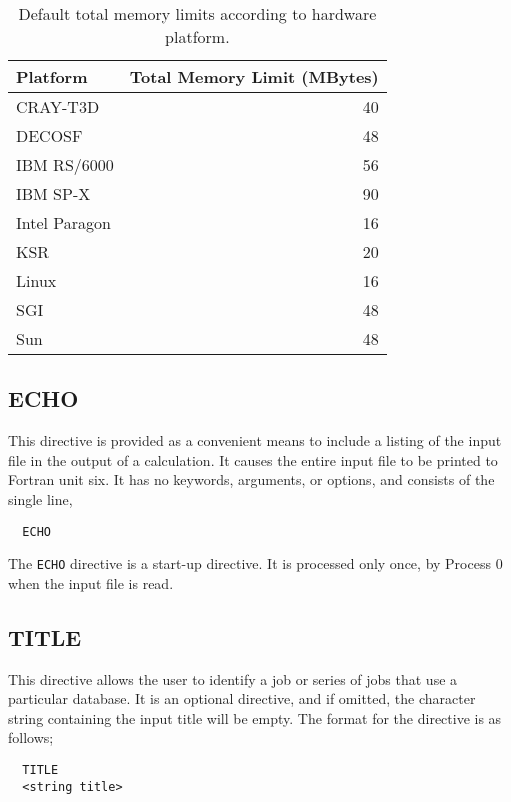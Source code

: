 \begin{table}
\caption{Default total memory limits according to hardware platform.}
\label{tbl:default-memory-limits}
\begin{tabular}{lr}
\hline\hline
Platform        & Total Memory Limit (MBytes) \\
\hline
CRAY-T3D        & 40 \\
DECOSF          & 48 \\
IBM RS/6000     & 56 \\
IBM SP-X        & 90 \\
Intel Paragon   & 16 \\
KSR             & 20 \\
Linux           & 16 \\
SGI             & 48 \\
Sun             & 48 \\
\hline\hline
\end{tabular}
\end{table}

\subsection{ECHO}


This directive is provided as a convenient means to include a listing of
the input file in the output of a calculation.  It causes the entire input 
file to be printed to Fortran unit six.  It has no keywords, arguments, or
options, and consists of the single line,

\begin{verbatim}
  ECHO
\end{verbatim}

The \verb+ECHO+ directive is a start-up directive.  It is processed only
once, by Process 0 when the input file is read.

\subsection{TITLE}

This directive allows the user to identify a job or series of jobs that use a
particular database.  It is an optional directive, and if omitted, the 
character string containing the input title will be empty.  The format for 
the directive is as follows;

\begin{verbatim}
  TITLE 
  <string title>
\end{verbatim}

